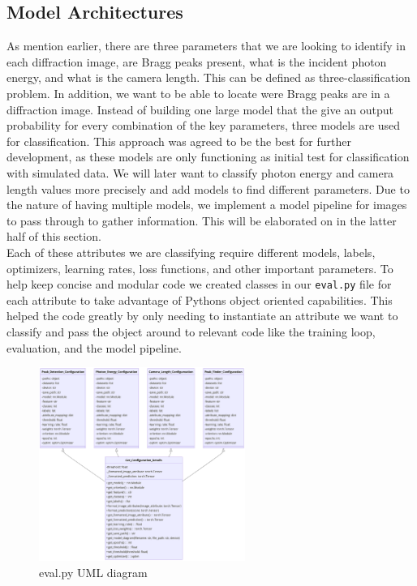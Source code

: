 \documentclass[12pt]{article}
\begin{document}
\newpage
\subsection{Model Architectures}

As mention earlier, there are three parameters that we are looking to identify in each diffraction image, are Bragg peaks present, what is the incident photon energy, and what is the camera length. This can be defined as three-classification problem.  In addition, we want to be able to locate were Bragg peaks are in a diffraction image. Instead of building one large model that the give an output probability for every combination of the key parameters, three models are used for classification. This approach was agreed to be the best for further development, as these models are only functioning as initial test for classification with simulated data. We will later want to classify photon energy and camera length values more precisely and add models to find different parameters. Due to the nature of having multiple models, we implement a model pipeline for images to pass through to gather information. This will be elaborated on in the latter half of this section.\\

Each of these attributes we are classifying require different models, labels, optimizers, learning rates, loss functions, and other important parameters. To help keep concise and modular code we created classes in our \texttt{eval.py} file for each attribute to take advantage of Pythons object oriented capabilities. This helped the code greatly by only needing to instantiate an attribute we want to classify and pass the object around to relevant code like the training loop, evaluation, and the model pipeline.\\

\begin{figure}[H]
    \centering
    \includegraphics[width=0.6\textwidth]{uml_diagrams/eval_uml2.png}
    \caption{eval.py UML diagram}
    \label{fig:eval}
\end{figure}
\end{document}
